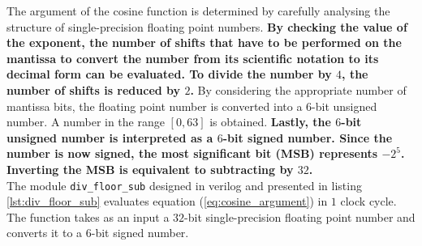\documentclass{article}
\begin{document}
The argument of the cosine function is determined by carefully analysing the structure of single-precision floating point numbers. \textbf{By checking the value of the exponent, the number of shifts that have to be performed on the mantissa to convert the number from its scientific notation to its decimal form can be evaluated. To divide the number by $4$, the number of shifts is reduced by $2$.} By considering the appropriate number of mantissa bits, the floating point number is converted into a $6$-bit unsigned number. A number in the range $[0, 63]$ is obtained. \textbf{Lastly, the $6$-bit unsigned number is interpreted as a $6$-bit signed number. Since the number is now signed, the most significant bit (MSB) represents $-2^{5}$. Inverting the MSB is equivalent to subtracting by $32$.}\\


The module {\tt div\_floor\_sub} designed in verilog and presented in listing \ref{lst:div_floor_sub} evaluates equation (\ref{eq:cosine_argument}) in $1$ clock cycle. The function takes as an input a $32$-bit single-precision floating point number and converts it to a $6$-bit signed number.
\end{document}
